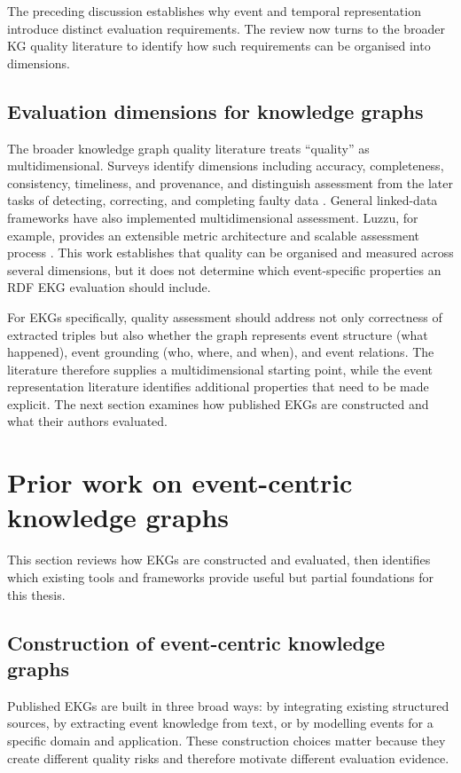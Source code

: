 The preceding discussion establishes why event and temporal representation introduce distinct evaluation requirements. The review now turns to the broader KG quality literature to identify how such requirements can be organised into dimensions.

\subsection{Evaluation dimensions for knowledge graphs}

The broader knowledge graph quality literature treats ``quality'' as multidimensional. Surveys identify dimensions including accuracy, completeness, consistency, timeliness, and provenance, and distinguish assessment from the later tasks of detecting, correcting, and completing faulty data \citep{kgquality2021,kgquality2024}. General linked-data frameworks have also implemented multidimensional assessment. Luzzu, for example, provides an extensible metric architecture and scalable assessment process \citep{luzzu2016}. This work establishes that quality can be organised and measured across several dimensions, but it does not determine which event-specific properties an RDF EKG evaluation should include.

For EKGs specifically, quality assessment should address not only correctness of extracted triples but also whether the graph represents event structure (what happened), event grounding (who, where, and when), and event relations. The literature therefore supplies a multidimensional starting point, while the event representation literature identifies additional properties that need to be made explicit. The next section examines how published EKGs are constructed and what their authors evaluated.

\section{Prior work on event-centric knowledge graphs}

This section reviews how EKGs are constructed and evaluated, then identifies which existing tools and frameworks provide useful but partial foundations for this thesis.

\subsection{Construction of event-centric knowledge graphs}

Published EKGs are built in three broad ways: by integrating existing structured sources, by extracting event knowledge from text, or by modelling events for a specific domain and application. These construction choices matter because they create different quality risks and therefore motivate different evaluation evidence.

